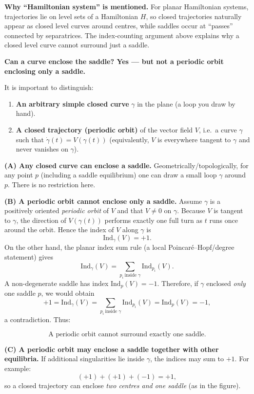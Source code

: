 \documentclass[12pt,a4paper]{article}
\theoremstyle{plain}
\theoremstyle{definition}      %
\begin{document}
	\medskip
	\noindent\textbf{Why “Hamiltonian system” is mentioned.}
	For planar Hamiltonian systems, trajectories lie on level sets of a Hamiltonian $H$,
	so closed trajectories naturally appear as closed level curves around centres, while saddles
	occur at ``passes'' connected by separatrices. The index-counting argument above explains
	why a closed level curve cannot surround just a saddle.
	
	
	\medskip
	\noindent\textbf{Can a curve enclose the saddle? Yes --- but not a periodic orbit enclosing only a saddle.}
	
	\medskip
	\noindent It is important to distinguish:
	
	\begin{enumerate}
		\item \textbf{An arbitrary simple closed curve} $\gamma$ in the plane (a loop you draw by hand).
		\item \textbf{A closed trajectory (periodic orbit)} of the vector field $V$, i.e.\ a curve $\gamma$ such that
		$\dot\gamma(t)=V(\gamma(t))$ (equivalently, $V$ is everywhere tangent to $\gamma$ and never vanishes on $\gamma$).
	\end{enumerate}
	
	\medskip
	\noindent\textbf{(A) Any closed curve can enclose a saddle.}
	Geometrically/topologically, for any point $p$ (including a saddle equilibrium) one can draw a small loop
	$\gamma$ around $p$. There is no restriction here.
	
	\medskip
	\noindent\textbf{(B) A periodic orbit cannot enclose only a saddle.}
	Assume $\gamma$ is a positively oriented \emph{periodic orbit} of $V$ and that $V\neq 0$ on $\gamma$.
	Because $V$ is tangent to $\gamma$, the direction of $V(\gamma(t))$ performs exactly one full turn as $t$
	runs once around the orbit. Hence the index of $V$ along $\gamma$ is
	\[
	\mathrm{Ind}_\gamma(V)=+1.
	\]
	On the other hand, the planar index sum rule (a local Poincar\'e--Hopf/degree statement) gives
	\[
	\mathrm{Ind}_\gamma(V)=\sum_{p_i\ \text{inside }\gamma}\mathrm{Ind}_{p_i}(V).
	\]
	A non-degenerate saddle has index $\mathrm{Ind}_{p}(V)=-1$. Therefore, if $\gamma$ enclosed \emph{only}
	one saddle $p$, we would obtain
	\[
	+1=\mathrm{Ind}_\gamma(V)=\sum_{p_i\ \text{inside }\gamma}\mathrm{Ind}_{p_i}(V)=\mathrm{Ind}_{p}(V)=-1,
	\]
	a contradiction. Thus:
	
	\[
	\boxed{\text{A periodic orbit cannot surround exactly one saddle.}}
	\]
	
	\medskip
	\noindent\textbf{(C) A periodic orbit may enclose a saddle together with other equilibria.}
	If additional singularities lie inside $\gamma$, the indices may sum to $+1$. For example:
	\[
	(+1)+(+1)+(-1)=+1,
	\]
	so a closed trajectory can enclose \emph{two centres and one saddle} (as in the figure).
	
\end{document}
